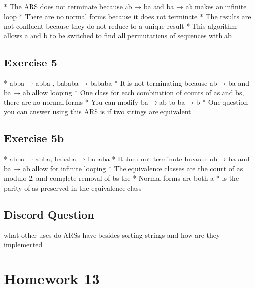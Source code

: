 \documentclass{article}
\theoremstyle{plain}
\theoremstyle{definition}
\theoremstyle{remark}
\begin{document}
* The ARS does not terminate because ab → ba and ba → ab makes an infinite loop
* There are no normal forms because it does not terminate
* The results are not confluent because they do not reduce to a unique result
* This algorithm allows a and b to be switched to find all permutations of sequences with ab

\subsection{Exercise 5}

* abba → abba , bababa → bababa
* It is not terminating because ab → ba and ba → ab allow looping
* One class for each combination of counts of as and bs, there are no normal forms
* You can modify ba → ab to ba → b
* One question you can answer using this ARS is if two strings are equivalent 

\subsection{Exercise 5b}

* abba → abba, bababa → bababa
* It does not terminate because ab → ba and ba → ab allow for infinite looping
* The equivalence classes are the count of as modulo 2, and complete removal of bs the 
* Normal forms are both a
* Is the parity of as preserved in the equivalence class

\subsection{Discord Question}

what other uses do ARSs have besides sorting strings and how are they implemented 


\section{Homework 13}\label{homework13}
\end{document}

